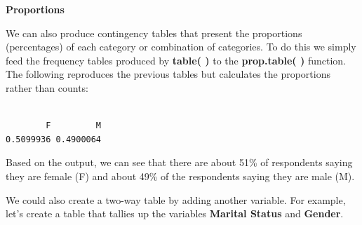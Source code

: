 \documentclass[
  letterpaper,
  DIV=11,
  numbers=noendperiod]{scrreprt}
\newenvironment{Shaded}{\begin{snugshade}}{\end{snugshade}}
\newcommand{\AttributeTok}[1]{\textcolor[rgb]{0.40,0.45,0.13}{#1}}
\newcommand{\CommentTok}[1]{\textcolor[rgb]{0.37,0.37,0.37}{#1}}
\newcommand{\FunctionTok}[1]{\textcolor[rgb]{0.28,0.35,0.67}{#1}}
\newcommand{\NormalTok}[1]{\textcolor[rgb]{0.00,0.23,0.31}{#1}}
\newcommand{\OtherTok}[1]{\textcolor[rgb]{0.00,0.23,0.31}{#1}}
\newcommand{\SpecialCharTok}[1]{\textcolor[rgb]{0.37,0.37,0.37}{#1}}
\newcommand{\StringTok}[1]{\textcolor[rgb]{0.13,0.47,0.30}{#1}}
\begin{document}
\textbf{Proportions}

We can also produce contingency tables that present the proportions
(percentages) of each category or combination of categories. To do this
we simply feed the frequency tables produced by \textbf{table( )} to the
\textbf{prop.table( )} function. The following reproduces the previous
tables but calculates the proportions rather than counts:

\begin{Shaded}
\end{Shaded}

\begin{verbatim}

        F         M 
0.5099936 0.4900064 
\end{verbatim}

Based on the output, we can see that there are about 51\% of respondents
saying they are female (F) and about 49\% of the respondents saying they
are male (M).

We could also create a two-way table by adding another variable. For
example, let's create a table that tallies up the variables
\textbf{Marital Status} and \textbf{Gender}.

\begin{Shaded}
\end{Shaded}
\end{document}
